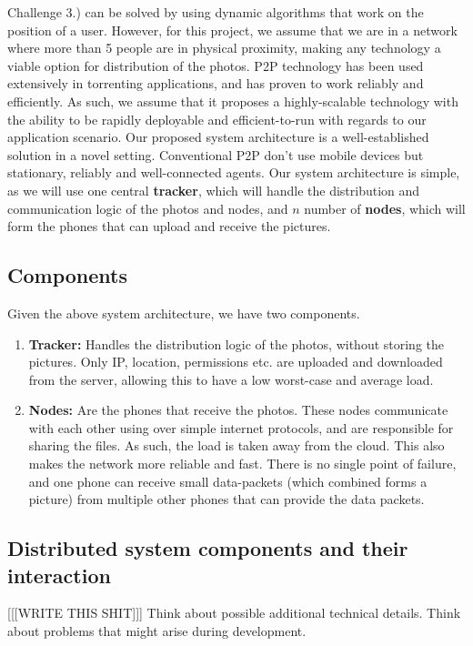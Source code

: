 \documentclass{report}
\begin{document}
Challenge 3.) can  be solved by using dynamic algorithms that work on the position of a user. 
However, for this project, we assume that we are in a network where more than 5 people are in physical proximity, making any technology a viable option for distribution of the photos.
\newline
P2P technology has been used extensively in torrenting applications, and has proven to work reliably and efficiently. 
As such, we assume that it proposes a highly-scalable technology with the ability to be rapidly deployable and efficient-to-run with regards to our application scenario.
Our proposed system architecture is a well-established solution in a novel setting.
Conventional P2P don't use mobile devices but stationary, reliably and well-connected agents. 
Our system architecture is simple, as we will use one central \textbf{tracker}, which will handle the distribution and communication logic of the photos and nodes, and $ n $ number of \textbf{nodes}, which will form the phones that can upload and receive the pictures.

\subsection{Components}
Given the above system architecture, we have two components. 

\begin{enumerate}
\item \textbf{Tracker:} Handles the distribution logic of the photos, without storing  the pictures. 
Only IP, location, permissions etc. are uploaded and downloaded from the server, allowing this to have a low worst-case and average load. 
\item \textbf{Nodes:} Are the phones that receive the photos. 
These nodes communicate with each other using over simple internet protocols, and are responsible for sharing the files. As such, the load is taken away from the cloud. 
This also makes the network more reliable and fast. There is no single point of failure, and one phone can receive small data-packets (which combined forms a picture) from multiple other phones that can provide the data packets.
\end{enumerate}

\subsection{Distributed system components and their interaction}
[[[WRITE THIS SHIT]]]
Think about possible additional technical details.
Think about problems that might arise during development.
\end{document}
